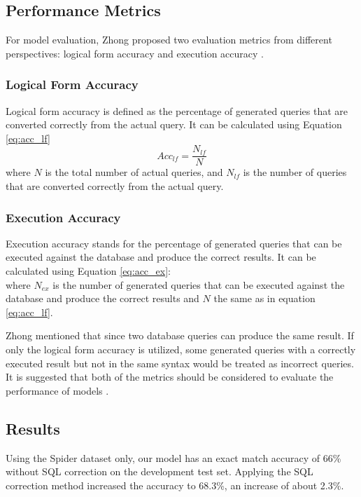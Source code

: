 \documentclass[conference]{IEEEtran}
\begin{document}
\subsection{Performance Metrics}
For model evaluation, Zhong proposed two evaluation metrics from different perspectives: logical form accuracy and execution accuracy \cite{Zhong2017Seq2SQL:Learning}.

\subsubsection{Logical Form Accuracy}
Logical form accuracy is defined as the percentage of generated queries that are converted correctly from the actual query. It can be calculated using Equation \ref{eq:acc_lf}
\begin{equation}
    Acc_{lf} = \frac{N_{lf}}{N}
   \label{eq:acc_lf}
\end{equation}
where $N$ is the total number of actual queries, and $N_{lf}$ is the number of queries that are converted correctly from the actual query.

\subsubsection{Execution Accuracy}
Execution accuracy stands for the percentage of generated queries that can be executed against the database and produce the correct results. It can be calculated using Equation \ref{eq:acc_ex}:
\begin{equation}
\label{eq:acc_ex}
\end{equation}
where $N_{ex}$ is the number of generated queries that can be executed against the database and produce the correct results and $N$ the same as in equation \ref{eq:acc_lf}.

Zhong mentioned that since two database queries can produce the same result. If only the logical form accuracy is utilized, some generated queries with a correctly executed result but not in the same syntax would be treated as incorrect queries. It is suggested that both of the metrics should be considered to evaluate the performance of models \cite{Zhong2017Seq2SQL:Learning}.

\subsection{Results}
Using the Spider dataset only, our model has an exact match accuracy of 66\% without SQL correction on the development test set. Applying the SQL correction method increased the accuracy to 68.3\%, an increase of about 2.3\%.
\end{document}
